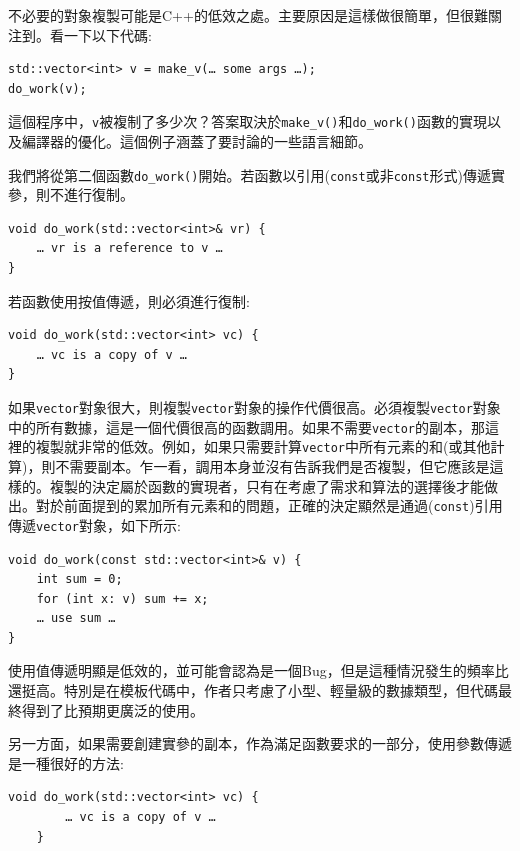 不必要的對象複製可能是C++的低效之處。主要原因是這樣做很簡單，但很難關注到。看一下以下代碼:

\begin{lstlisting}[style=styleCXX]
std::vector<int> v = make_v(… some args …);
do_work(v);
\end{lstlisting}

這個程序中，\texttt{v}被複制了多少次？答案取決於\texttt{make\_v()}和\texttt{do\_work()}函數的實現以及編譯器的優化。這個例子涵蓋了要討論的一些語言細節。


我們將從第二個函數\texttt{do\_work()}開始。若函數以引用(\texttt{const}或非\texttt{const}形式)傳遞實參，則不進行復制。

\begin{lstlisting}[style=styleCXX]
void do_work(std::vector<int>& vr) {
	… vr is a reference to v …
}
\end{lstlisting}

若函數使用按值傳遞，則必須進行復制:

\begin{lstlisting}[style=styleCXX]
void do_work(std::vector<int> vc) {
	… vc is a copy of v …
}
\end{lstlisting}

如果\texttt{vector}對象很大，則複製\texttt{vector}對象的操作代價很高。必須複製\texttt{vector}對象中的所有數據，這是一個代價很高的函數調用。如果不需要\texttt{vector}的副本，那這裡的複製就非常的低效。例如，如果只需要計算\texttt{vector}中所有元素的和(或其他計算)，則不需要副本。乍一看，調用本身並沒有告訴我們是否複製，但它應該是這樣的。複製的決定屬於函數的實現者，只有在考慮了需求和算法的選擇後才能做出。對於前面提到的累加所有元素和的問題，正確的決定顯然是通過(\texttt{const})引用傳遞\texttt{vector}對象，如下所示:

\begin{lstlisting}[style=styleCXX]
void do_work(const std::vector<int>& v) {
	int sum = 0;
	for (int x: v) sum += x;
	… use sum … 
}
\end{lstlisting}

使用值傳遞明顯是低效的，並可能會認為是一個Bug，但是這種情況發生的頻率比還挺高。特別是在模板代碼中，作者只考慮了小型、輕量級的數據類型，但代碼最終得到了比預期更廣泛的使用。

另一方面，如果需要創建實參的副本，作為滿足函數要求的一部分，使用參數傳遞是一種很好的方法:

\begin{lstlisting}[style=styleCXX]
	void do_work(std::vector<int> vc) {
		… vc is a copy of v …
	}
\end{lstlisting}

